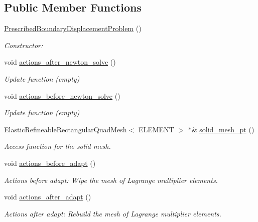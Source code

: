 \subsection*{Public Member Functions}
\begin{DoxyCompactItemize}
\item 
\hyperlink{classPrescribedBoundaryDisplacementProblem_ac0c8b47eeb75ba2c618757e6b56e62dc}{Prescribed\+Boundary\+Displacement\+Problem} ()
\begin{DoxyCompactList}\small\item\em Constructor\+: \end{DoxyCompactList}\item 
void \hyperlink{classPrescribedBoundaryDisplacementProblem_a53e7d18d9d748388160d6c4106f1d493}{actions\+\_\+after\+\_\+newton\+\_\+solve} ()
\begin{DoxyCompactList}\small\item\em Update function (empty) \end{DoxyCompactList}\item 
void \hyperlink{classPrescribedBoundaryDisplacementProblem_ad2184bb8d7391da21bec62d4aacf5c20}{actions\+\_\+before\+\_\+newton\+\_\+solve} ()
\begin{DoxyCompactList}\small\item\em Update function (empty) \end{DoxyCompactList}\item 
Elastic\+Refineable\+Rectangular\+Quad\+Mesh$<$ E\+L\+E\+M\+E\+NT $>$ $\ast$\& \hyperlink{classPrescribedBoundaryDisplacementProblem_ac0fc3028f61cec5ac4b01670d7728934}{solid\+\_\+mesh\+\_\+pt} ()
\begin{DoxyCompactList}\small\item\em Access function for the solid mesh. \end{DoxyCompactList}\item 
void \hyperlink{classPrescribedBoundaryDisplacementProblem_a2e9f335e8680b0f2338b579e37e9d38a}{actions\+\_\+before\+\_\+adapt} ()
\begin{DoxyCompactList}\small\item\em Actions before adapt\+: Wipe the mesh of Lagrange multiplier elements. \end{DoxyCompactList}\item 
void \hyperlink{classPrescribedBoundaryDisplacementProblem_aae7225db18ad5c8429c0eb96fa37b585}{actions\+\_\+after\+\_\+adapt} ()
\begin{DoxyCompactList}\small\item\em Actions after adapt\+: Rebuild the mesh of Lagrange multiplier elements. \end{DoxyCompactList}\item 

\end{DoxyCompactItemize}
